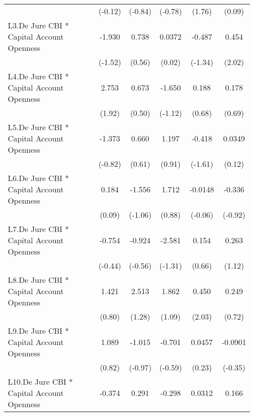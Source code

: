 {\begin{tabular}{l*{5}{c}}
                &  (-0.12)         &  (-0.84)         &  (-0.78)         &   (1.76)         &   (0.09)         \\
[1em]
L3.De Jure CBI * Capital Account Openness&   -1.930         &    0.738         &   0.0372         &   -0.487         &    0.454\sym{*}  \\
                &  (-1.52)         &   (0.56)         &   (0.02)         &  (-1.34)         &   (2.02)         \\
[1em]
L4.De Jure CBI * Capital Account Openness&    2.753         &    0.673         &   -1.650         &    0.188         &    0.178         \\
                &   (1.92)         &   (0.50)         &  (-1.12)         &   (0.68)         &   (0.69)         \\
[1em]
L5.De Jure CBI * Capital Account Openness&   -1.373         &    0.660         &    1.197         &   -0.418         &   0.0349         \\
                &  (-0.82)         &   (0.61)         &   (0.91)         &  (-1.61)         &   (0.12)         \\
[1em]
L6.De Jure CBI * Capital Account Openness&    0.184         &   -1.556         &    1.712         &  -0.0148         &   -0.336         \\
                &   (0.09)         &  (-1.06)         &   (0.88)         &  (-0.06)         &  (-0.92)         \\
[1em]
L7.De Jure CBI * Capital Account Openness&   -0.754         &   -0.924         &   -2.581         &    0.154         &    0.263         \\
                &  (-0.44)         &  (-0.56)         &  (-1.31)         &   (0.66)         &   (1.12)         \\
[1em]
L8.De Jure CBI * Capital Account Openness&    1.421         &    2.513         &    1.862         &    0.450\sym{*}  &    0.249         \\
                &   (0.80)         &   (1.28)         &   (1.09)         &   (2.03)         &   (0.72)         \\
[1em]
L9.De Jure CBI * Capital Account Openness&    1.089         &   -1.015         &   -0.701         &   0.0457         &  -0.0901         \\
                &   (0.82)         &  (-0.97)         &  (-0.59)         &   (0.23)         &  (-0.35)         \\
[1em]
L10.De Jure CBI * Capital Account Openness&   -0.374         &    0.291         &   -0.298         &   0.0312         &    0.166         \\

\end{tabular}}
